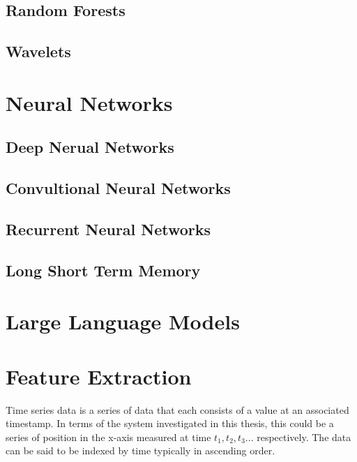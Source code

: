 \clearpage
\subsection{Random Forests}

\subsection{Wavelets}

\section{Neural Networks}
\subsection{Deep Nerual Networks}
\subsection{Convultional Neural Networks}
\subsection{Recurrent Neural Networks}
\subsection{Long Short Term Memory}

\section{Large Language Models}

 
\section{Feature Extraction}
Time series data is a series of data that each consists of a value at an associated timestamp. In terms of the system investigated in this thesis, this could be a series of position in the x-axis measured at time $t_1, t_2, t_3...$ respectively. The data can be said to be indexed by time \cite{yinPredictionAnalysisTime2023} typically in ascending order.

